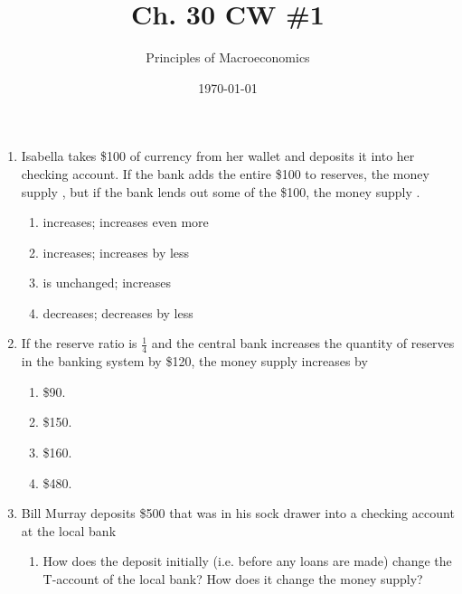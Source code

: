 \documentclass{article}
\title{Ch. 30 CW \#1}
\author{Principles of Macroeconomics}
\date{\today}
\begin{document}
\maketitle

\begin{enumerate}

\item Isabella takes \$100 of currency from her wallet and deposits it into her checking account. If the bank adds the entire \$100 to reserves, the money supply \underline{\phantom{xxxxxxxxxx}}, but if the bank lends out some of the \$100, the money supply \underline{\phantom{xxxxxxxxxx}}.

	\begin{enumerate}
	
	\item increases; increases even more
	
	\item increases; increases by less
	
	\item is unchanged; increases
	
	\item decreases; decreases by less
	
	\end{enumerate}
	
\item If the reserve ratio is $\frac{1}{4}$ and the central bank increases the quantity of reserves in the banking system by \$120, the money supply increases by

	\begin{enumerate}
	
	\item \$90.
	
	\item \$150.
	
	\item \$160.
	
	\item \$480.
	
	\end{enumerate}

\item Bill Murray deposits \$500 that was in his sock drawer into a checking account at the local bank

	\begin{enumerate}
	
	\item How does the deposit initially (i.e. before any loans are made) change the T-account of the local bank? How does it change the money supply?
	

\end{enumerate}
\end{enumerate}
\end{document}
